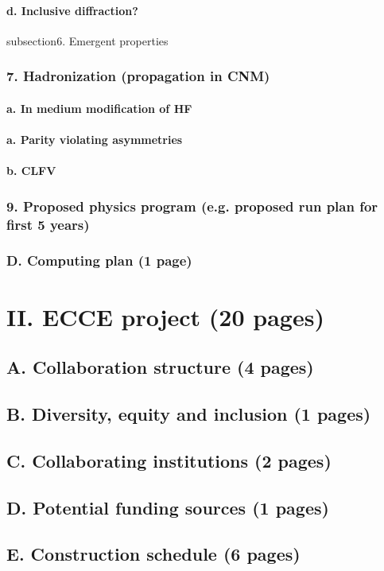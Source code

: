 \documentclass{report}
\begin{document}
\subsubsection{d. Inclusive diffraction?}
subsection{6. Emergent properties}
\subsection{7. Hadronization (propagation in CNM)}
\subsubsection{a. In medium modification of HF}
\subsubsection{a. Parity violating asymmetries}
\subsubsection{b. CLFV}
\subsection{9. Proposed physics program (e.g. proposed run plan for first 5 years)}
\subsection{D. Computing plan (1 page)}
%
\chapter{II. ECCE project (20 pages)}
%
\section{A. Collaboration structure (4 pages)}
\section{B. Diversity, equity and inclusion (1 pages)}
\section{C. Collaborating institutions (2 pages)}
\section{D. Potential funding sources (1 pages)}
\section{E. Construction schedule (6 pages)}
\end{document}
